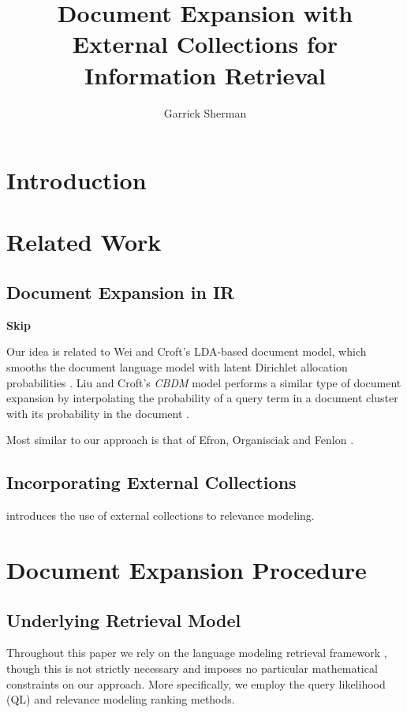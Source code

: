 \documentclass{report}
\begin{document}
\author{Garrick Sherman}

\title{Document Expansion with External Collections for Information Retrieval}

\maketitle
\begin{abstract}
\end{abstract}

\section{Introduction}\label{section.intro}

\section{Related Work}\label{section.related}

\subsection{Document Expansion in IR}\label{section.related.ir}

\textbf{Skip}

Our idea is related to Wei and Croft's LDA-based document model, which smooths the document language model with latent Dirichlet allocation probabilities \cite{Wei2006}. Liu and Croft's \textit{CBDM} model performs a similar type of document expansion by interpolating the probability of a query term in a document cluster with its probability in the document \cite{Liu2004}.

Most similar to our approach is that of Efron, Organisciak and Fenlon \cite{Efron2012}.

\subsection{Incorporating External Collections}\label{section.external.collections}

\cite{Diaz2006} introduces the use of external collections to relevance modeling.

\section{Document Expansion Procedure}\label{section.expanding}

\subsection{Underlying Retrieval Model}\label{section.expanding.model}
Throughout this paper we rely on the language modeling retrieval framework \cite{Lafferty2001}, though this is not strictly necessary and imposes no particular mathematical constraints on our approach. More specifically, we employ the query likelihood (QL) and relevance modeling ranking methods. 
\end{document}
